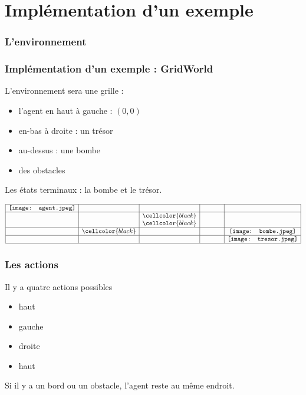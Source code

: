 \documentclass{beamer}
\begin{document}
\section[Implémentation d'un exemple]{Implémentation d'un exemple}
\subsubsection[L'environnement]{L'environnement}

\begin{frame}
\frametitle{Implémentation d'un exemple : GridWorld}
L'environnement sera une grille :
\begin{itemize}
\item l'agent en haut à gauche : $(0,0)$
\item en-bas à droite : un trésor
\item au-dessus : une bombe
\item des obstacles
\end{itemize}
Les états terminaux : la bombe et le trésor.
\end{frame} 

\begin{frame}
$$\begin{array}{|c|c|c|c|c|}
\hline
\texttt{[image: agent.jpeg]} & \hspace*{1cm} &  \hspace*{1cm}&  \hspace*{1cm} & \\
\hline
& & \cellcolor{black} & & \\
& & \cellcolor{black} & & \\
\hline
& \cellcolor{black} & & & \texttt{[image: bombe.jpeg]}\\
\hline
& & & & \texttt{[image: tresor.jpeg]} \\
\hline
\end{array}
$$
\end{frame}

\begin{frame}
\frametitle{Les actions}
Il y a quatre actions possibles
\begin{itemize}
\item haut
\item gauche
\item droite
\item haut
\end{itemize}\pause

Si il y a un bord ou un obstacle, l'agent reste au même endroit. 




\end{frame}
\end{document}
